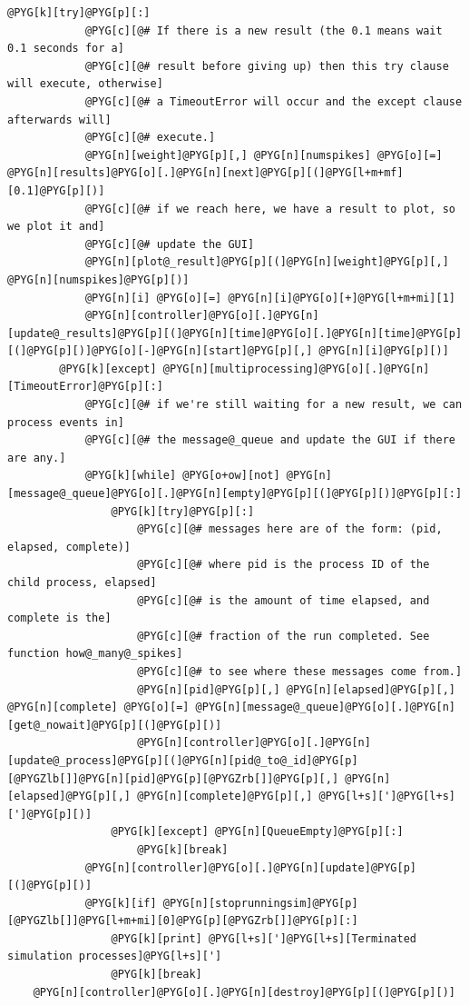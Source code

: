 \documentclass[letterpaper,10pt,english]{manual}
\begin{document}
\begin{Verbatim}[commandchars=@\[\]]
        @PYG[k][try]@PYG[p][:]
            @PYG[c][@# If there is a new result (the 0.1 means wait 0.1 seconds for a]
            @PYG[c][@# result before giving up) then this try clause will execute, otherwise]
            @PYG[c][@# a TimeoutError will occur and the except clause afterwards will]
            @PYG[c][@# execute.]
            @PYG[n][weight]@PYG[p][,] @PYG[n][numspikes] @PYG[o][=] @PYG[n][results]@PYG[o][.]@PYG[n][next]@PYG[p][(]@PYG[l+m+mf][0.1]@PYG[p][)]
            @PYG[c][@# if we reach here, we have a result to plot, so we plot it and]
            @PYG[c][@# update the GUI]
            @PYG[n][plot@_result]@PYG[p][(]@PYG[n][weight]@PYG[p][,] @PYG[n][numspikes]@PYG[p][)]
            @PYG[n][i] @PYG[o][=] @PYG[n][i]@PYG[o][+]@PYG[l+m+mi][1]
            @PYG[n][controller]@PYG[o][.]@PYG[n][update@_results]@PYG[p][(]@PYG[n][time]@PYG[o][.]@PYG[n][time]@PYG[p][(]@PYG[p][)]@PYG[o][-]@PYG[n][start]@PYG[p][,] @PYG[n][i]@PYG[p][)]
        @PYG[k][except] @PYG[n][multiprocessing]@PYG[o][.]@PYG[n][TimeoutError]@PYG[p][:]
            @PYG[c][@# if we're still waiting for a new result, we can process events in]
            @PYG[c][@# the message@_queue and update the GUI if there are any.]
            @PYG[k][while] @PYG[o+ow][not] @PYG[n][message@_queue]@PYG[o][.]@PYG[n][empty]@PYG[p][(]@PYG[p][)]@PYG[p][:]
                @PYG[k][try]@PYG[p][:]
                    @PYG[c][@# messages here are of the form: (pid, elapsed, complete)]
                    @PYG[c][@# where pid is the process ID of the child process, elapsed]
                    @PYG[c][@# is the amount of time elapsed, and complete is the]
                    @PYG[c][@# fraction of the run completed. See function how@_many@_spikes]
                    @PYG[c][@# to see where these messages come from.]
                    @PYG[n][pid]@PYG[p][,] @PYG[n][elapsed]@PYG[p][,] @PYG[n][complete] @PYG[o][=] @PYG[n][message@_queue]@PYG[o][.]@PYG[n][get@_nowait]@PYG[p][(]@PYG[p][)]
                    @PYG[n][controller]@PYG[o][.]@PYG[n][update@_process]@PYG[p][(]@PYG[n][pid@_to@_id]@PYG[p][@PYGZlb[]]@PYG[n][pid]@PYG[p][@PYGZrb[]]@PYG[p][,] @PYG[n][elapsed]@PYG[p][,] @PYG[n][complete]@PYG[p][,] @PYG[l+s][']@PYG[l+s][']@PYG[p][)]
                @PYG[k][except] @PYG[n][QueueEmpty]@PYG[p][:]
                    @PYG[k][break]
            @PYG[n][controller]@PYG[o][.]@PYG[n][update]@PYG[p][(]@PYG[p][)]
            @PYG[k][if] @PYG[n][stoprunningsim]@PYG[p][@PYGZlb[]]@PYG[l+m+mi][0]@PYG[p][@PYGZrb[]]@PYG[p][:]
                @PYG[k][print] @PYG[l+s][']@PYG[l+s][Terminated simulation processes]@PYG[l+s][']
                @PYG[k][break]
    @PYG[n][controller]@PYG[o][.]@PYG[n][destroy]@PYG[p][(]@PYG[p][)]


\end{Verbatim}
\end{document}

